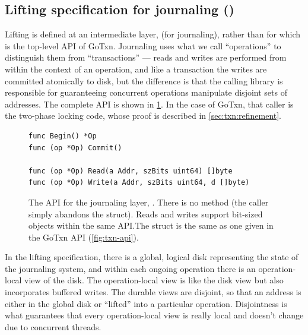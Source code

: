 \subsection{Lifting specification for journaling ()}
\label{sec:txn:lifting}

Lifting is defined at an intermediate layer,  (for journaling), rather
than for  which is the top-level API of GoTxn. Journaling uses what we
call ``operations'' to distinguish them from ``transactions'' --- reads and
writes are performed from within the context of an operation, and like a
transaction the writes are committed atomically to
disk, but the difference is that the calling library is responsible for guaranteeing
concurrent operations manipulate disjoint sets of addresses. The complete API is
shown in \cref{fig:jrnl-api}. In the case of GoTxn, that caller is
the two-phase locking code, whose proof is described in \cref{sec:txn:refinement}.

\begin{figure}[ht]
  \begin{verbatim}
func Begin() *Op
func (op *Op) Commit()

func (op *Op) Read(a Addr, szBits uint64) []byte
func (op *Op) Write(a Addr, szBits uint64, d []byte)
  \end{verbatim}
  \tightenspace
  \caption[API for the journaling layer.]{The API for the journaling layer, . There is no
     method (the caller simply abandons the  struct). Reads
    and writes support bit-sized objects within the same API.\@ The 
    struct is the same as one given in the GoTxn API (\cref{fig:txn-api}).}
  \label{fig:jrnl-api}
\end{figure}

In the lifting specification, there is a global, logical disk representing the
state of the journaling system, and within each ongoing operation there is an
operation-local view of the disk. The operation-local view is like the disk
view but also incorporates buffered writes. The durable views are disjoint, so
that an address is either in the global disk or ``lifted'' into a particular
operation. Disjointness is what guarantees that every operation-local view is really local and
doesn't change due to concurrent threads.

